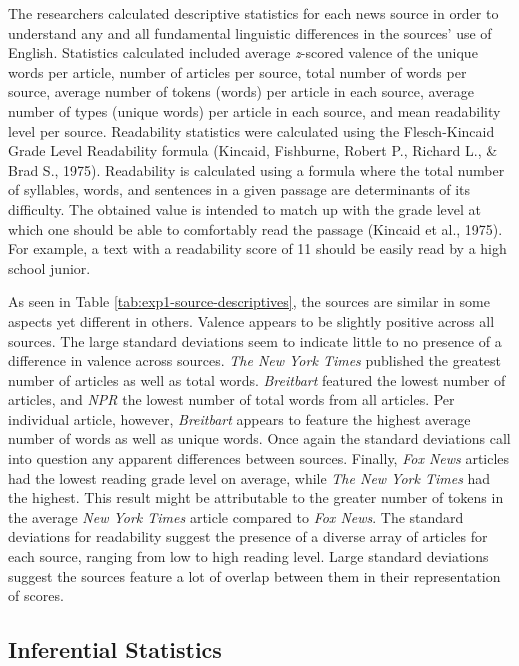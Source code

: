 \documentclass[english,,man]{apa6}
\begin{document}
The researchers calculated descriptive statistics for each news source in order to understand any and all fundamental linguistic differences in the sources' use of English. Statistics calculated included average \emph{z}-scored valence of the unique words per article, number of articles per source, total number of words per source, average number of tokens (words) per article in each source, average number of types (unique words) per article in each source, and mean readability level per source. Readability statistics were calculated using the Flesch-Kincaid Grade Level Readability formula (Kincaid, Fishburne, Robert P., Richard L., \& Brad S., 1975). Readability is calculated using a formula where the total number of syllables, words, and sentences in a given passage are determinants of its difficulty. The obtained value is intended to match up with the grade level at which one should be able to comfortably read the passage (Kincaid et al., 1975). For example, a text with a readability score of 11 should be easily read by a high school junior.

As seen in Table \ref{tab:exp1-source-descriptives}, the sources are similar in some aspects yet different in others. Valence appears to be slightly positive across all sources. The large standard deviations seem to indicate little to no presence of a difference in valence across sources.
\emph{The New York Times} published the greatest number of articles as well as total words. \emph{Breitbart} featured the lowest number of articles, and \emph{NPR} the lowest number of total words from all articles. Per individual article, however, \emph{Breitbart} appears to feature the highest average number of words as well as unique words. Once again the standard deviations call into question any apparent differences between sources. Finally, \emph{Fox News} articles had the lowest reading grade level on average, while \emph{The New York Times} had the highest. This result might be attributable to the greater number of tokens in the average \emph{New York Times} article compared to \emph{Fox News}. The standard deviations for readability suggest the presence of a diverse array of articles for each source, ranging from low to high reading level. Large standard deviations suggest the sources feature a lot of overlap between them in their representation of scores.

\hypertarget{inferential-statistics}{%
\subsection{Inferential Statistics}\label{inferential-statistics}}
\end{document}
